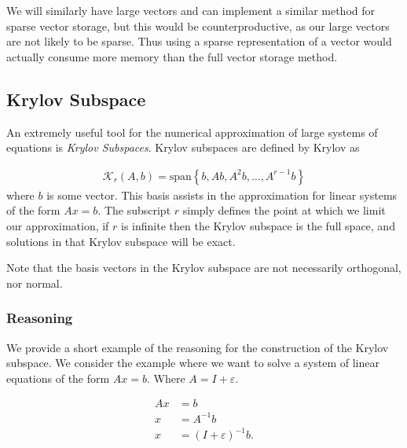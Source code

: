 \documentclass[../fem.tex]{subfiles}
\begin{document}
We will similarly have large vectors and can implement a similar method for
sparse vector storage, but this would be counterproductive, as our large
vectors are not likely to be sparse. Thus using a sparse representation of a
vector would actually consume more memory than the full vector storage method.

\subsection{Krylov Subspace}%
\label{sub:krylov_subspace}

An extremely useful tool for the numerical approximation of large systems of
equations is \textit{Krylov Subspaces}. Krylov subspaces are defined by
Krylov\cite{KRYLOV} as

\begin{align*}
  \mathcal{K}_r\left(A,b\right)=\text{span}\left\{b,Ab,A^2b,\ldots,A^{r-1}b\right\}
\end{align*}
where $b$ is some vector. This basis assists in the approximation for linear
systems of the form $Ax=b$. The subscript $r$ simply defines the point at which
we limit our approximation, if $r$ is infinite then the Krylov subspace is the
full space, and solutions in that Krylov subspace will be exact.

Note that the basis vectors in the Krylov subspace are not necessarily
orthogonal, nor normal.

\subsubsection{Reasoning}%
\label{ssub:reasoning}

We provide a short example of the reasoning for the construction of the Krylov
subspace. We consider the example where we want to solve a system of linear
equations of the form $Ax=b$. Where $A=I+\varepsilon$.

\begin{align*}
  Ax&=b\\
  x&=A^{-1}b\\
  x&=(I+\varepsilon)^{-1}b.
\end{align*}
\end{document}
